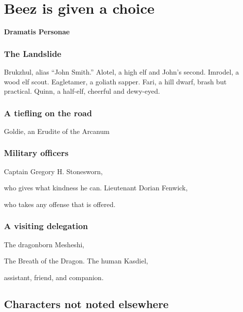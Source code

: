 \section{Beez is given a choice}
\textbf{\LARGE Dramatis Personae}
\begin{multicols}{2}

\subsubsection{The Landslide}
Brukzhul, alias ``John Smith.'' \newline
Alotel, a high elf and John's second. \newline
Imrodel, a wood elf scout. \newline
Eagletamer, a goliath sapper. \newline
Fari, a hill dwarf, brash but practical. \newline
Quinn, a half-elf, cheerful and dewy-eyed. \newline

\subsubsection{A tiefling on the road}
Goldie, an Erudite of the Arcanum

\subsubsection{Military officers}
Captain Gregory H. Stonesworn,\par who gives what kindness he can. \newline
Lieutenant Dorian Fenwick,\par who takes any offense that is offered.

\subsubsection{A visiting delegation}
The dragonborn Mesheshi,\par The Breath of the Dragon. \newline
The human Kasdiel,\par assistant, friend, and companion. \newline
\end{multicols}
\noindent
\hrulefill

\subsection*{Characters not noted elsewhere}

